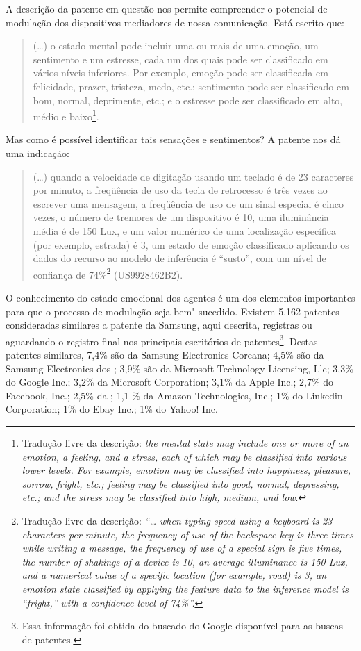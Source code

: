 A descrição da patente em questão nos permite compreender o potencial de
modulação dos dispositivos mediadores de nossa comunicação. Está escrito
que:

\begin{quote}
(\ldots{}) o estado mental pode incluir uma ou mais de uma emoção, um
sentimento e um estresse, cada um dos quais pode ser classificado em
vários níveis inferiores. Por exemplo, emoção pode ser classificada em
felicidade, prazer, tristeza, medo, etc.; sentimento pode ser
classificado em bom, normal, deprimente, etc.; e o estresse pode ser
classificado em alto, médio e baixo\footnote{Tradução livre da
  descrição: \emph{the mental state may include one or more of an emotion, a
    feeling, and a stress, each of which may be classified into various
    lower levels. For example, emotion may be classified into happiness,
    pleasure, sorrow, fright, etc.; feeling may be classified into good,
    normal, depressing, etc.; and the stress may be classified into high,
    medium, and low}.}.
\end{quote}

Mas como é possível identificar tais sensações e sentimentos? A patente
nos dá uma indicação:

\begin{quote}
(\ldots{}) quando a velocidade de digitação usando um teclado é de 23
caracteres por minuto, a freqüência de uso da tecla de retrocesso é três
vezes ao escrever uma mensagem, a freqüência de uso de um sinal especial
é cinco vezes, o número de tremores de um dispositivo é 10, uma
iluminância média é de 150 Lux, e um valor numérico de uma localização
específica (por exemplo, estrada) é 3, um estado de emoção classificado
aplicando os dados do recurso ao modelo de inferência é ``susto'', com
um nível de confiança de 74\%\footnote{Tradução livre da descrição:
  \emph{``\ldots{} when typing speed using a keyboard is 23 characters per
    minute, the frequency of use of the backspace key is three times while
    writing a message, the frequency of use of a special sign is five
    times, the number of shakings of a device is 10, an average
    illuminance is 150 Lux, and a numerical value of a specific location
    (for example, road) is 3, an emotion state classified by applying the
    feature data to the inference model is ``fright,'' with a confidence
    level of 74\%''.}} (US9928462B2).
\end{quote}

O conhecimento do estado emocional dos agentes é um dos elementos
importantes para que o processo de modulação seja bem"-sucedido. Existem
5.162 patentes consideradas similares a patente da Samsung, aqui
descrita, registras ou aguardando o registro final nos principais
escritórios de patentes\footnote{Essa informação foi obtida do buscado
  do Google disponível para as buscas de patentes.}. Destas patentes
similares, 7,4\% são da Samsung Electronics Coreana; 4,5\% são da
Samsung Electronics dos ; 3,9\% são da Microsoft Technology
Licensing, Llc; 3,3\% do Google Inc.; 3,2\% da Microsoft Corporation;
3,1\% da Apple Inc.; 2,7\% do Facebook, Inc.; 2,5\% da ; 1,1 \% da
Amazon Technologies, Inc.; 1\% do Linkedin Corporation; 1\% do Ebay
Inc.; 1\% do Yahoo! Inc.

